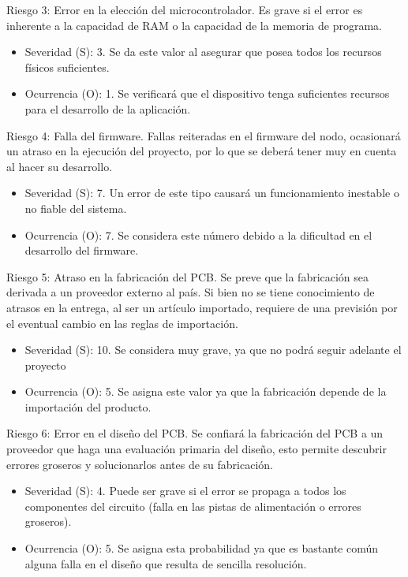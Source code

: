 \documentclass[11pt]{charter}
\begin{document}
Riesgo 3: Error en la elección del microcontrolador. Es grave si el error es inherente a la capacidad de RAM o la capacidad de la memoria de programa.
\begin{itemize}
\item Severidad (S): 3. Se da este valor al asegurar que posea todos los recursos físicos suficientes.
\item Ocurrencia (O): 1. Se verificará que el dispositivo tenga suficientes recursos para el desarrollo de la aplicación.
\end{itemize}

Riesgo 4: Falla del firmware. Fallas reiteradas en el firmware del nodo, ocasionará un atraso en la ejecución del proyecto, por lo que se deberá tener muy en cuenta al hacer su desarrollo. 
\begin{itemize}
\item Severidad (S): 7. Un error de este tipo causará un funcionamiento inestable o no fiable del sistema.
\item Ocurrencia (O): 7. Se considera este número debido a la dificultad en el desarrollo del firmware.
\end{itemize}

Riesgo 5: Atraso en la fabricación del PCB. Se preve que la fabricación sea derivada a un proveedor externo al país. Si bien no se tiene conocimiento de atrasos en la entrega, al ser un artículo importado, requiere de una previsión por el eventual cambio en las reglas de importación.
\begin{itemize}
\item Severidad (S): 10. Se considera muy grave, ya que no podrá seguir adelante el proyecto
\item Ocurrencia (O): 5. Se asigna este valor ya que la fabricación depende de la importación del producto. 
\end{itemize}

Riesgo 6: Error en el diseño del PCB. Se confiará la fabricación del PCB a un proveedor que haga una evaluación primaria del diseño, esto permite descubrir errores groseros y solucionarlos antes de su fabricación.
\begin{itemize}
\item Severidad (S): 4. Puede ser grave si el error se propaga a todos los componentes del circuito (falla en las pistas de alimentación o errores groseros).
\item Ocurrencia (O): 5. Se asigna esta probabilidad ya que es bastante común alguna falla en el diseño que resulta de sencilla resolución.
\end{itemize}
\end{document}
